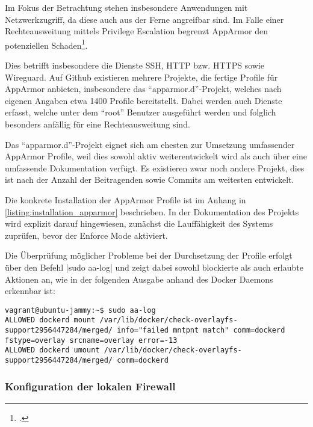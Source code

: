 Im Fokus der Betrachtung stehen insbesondere Anwendungen mit Netzwerkzugriff, da diese auch aus der Ferne angreifbar sind. Im Falle einer Rechteausweitung mittels Privilege Escalation begrenzt AppArmor den potenziellen Schaden\footcite[Vgl.][]{hutchinsIntelligenceDrivenComputerNetwork}.

Dies betrifft insbesondere die Dienste \ac{SSH}, \ac{HTTP} bzw. \ac{HTTPS} sowie Wireguard. Auf Github existieren mehrere Projekte, die fertige Profile für AppArmor anbieten, insbesondere das \enquote{apparmor.d}-Projekt, welches nach eigenen Angaben etwa 1400 Profile bereitstellt. Dabei werden auch Dienste erfasst, welche unter dem \enquote{root} Benutzer ausgeführt werden und folglich besonders anfällig für eine Rechteausweitung sind.

Das \enquote{apparmor.d}-Projekt eignet sich am ehesten zur Umsetzung umfassender AppArmor Profile, weil dies sowohl aktiv weiterentwickelt wird als auch über eine umfassende Dokumentation verfügt. Es existieren zwar noch andere Projekt, dies ist nach der Anzahl der Beitragenden sowie Commits am weitesten entwickelt.

Die konkrete Installation der AppArmor Profile ist im Anhang in \autoref{listing:installation_apparmor} beschrieben. In der Dokumentation des Projekts wird explizit darauf hingewiesen, zunächst die Lauffähigkeit des Systems zuprüfen, bevor der Enforce Mode aktiviert.

Die Überprüfung möglicher Probleme bei der Durchsetzung der Profile erfolgt über den Befehl |sudo aa-log|
und zeigt dabei sowohl blockierte als auch erlaubte Aktionen an, wie in der folgenden Ausgabe anhand des Docker Daemons erkennbar ist:

\begin{verbatim}
vagrant@ubuntu-jammy:~$ sudo aa-log 
ALLOWED dockerd mount /var/lib/docker/check-overlayfs-support2956447284/merged/ info="failed mntpnt match" comm=dockerd fstype=overlay srcname=overlay error=-13
ALLOWED dockerd umount /var/lib/docker/check-overlayfs-support2956447284/merged/ comm=dockerd
\end{verbatim}

\subsubsection{Konfiguration der lokalen Firewall}


